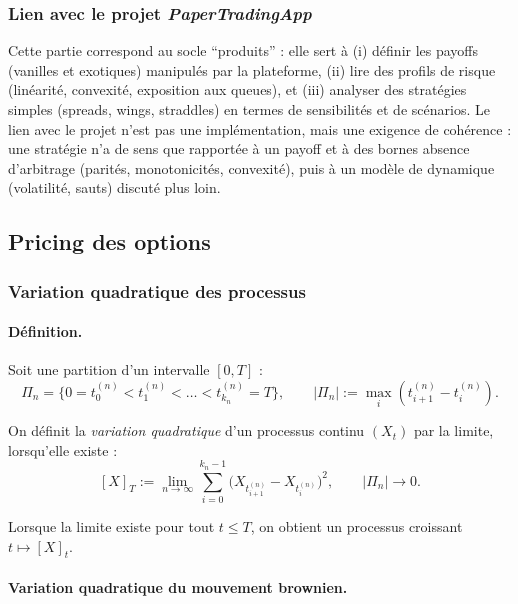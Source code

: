 \documentclass[11pt,a4paper]{article}
\newcommand{\1}{\mathbf{1}}
\begin{document}
\subsubsection{Lien avec le projet \emph{PaperTradingApp}}

Cette partie correspond au socle ``produits'' : elle sert \`a (i) d\'efinir les payoffs (vanilles et exotiques) manipul\'es
par la plateforme, (ii) lire des profils de risque (lin\'earit\'e, convexit\'e, exposition aux queues), et (iii) analyser des
strat\'egies simples (spreads, wings, straddles) en termes de sensibilit\'es et de sc\'enarios. Le lien avec le projet n'est pas
une impl\'ementation, mais une exigence de coh\'erence : une strat\'egie n'a de sens que rapport\'ee \`a un payoff et \`a des bornes
absence d'arbitrage (parit\'es, monotonicit\'es, convexit\'e), puis \`a un mod\`ele de dynamique (volatilité, sauts) discut\'e plus loin.

\subsection{Pricing des options}

\subsubsection{Variation quadratique des processus}

\bigskip

\paragraph{Définition.}

Soit une partition d'un intervalle $[0,T]$ :
\[
\Pi_n = \{0 = t_0^{(n)} < t_1^{(n)} < \dots < t_{k_n}^{(n)} = T\},
\qquad
|\Pi_n| := \max_i (t^{(n)}_{i+1} - t^{(n)}_i).
\]

On définit la \emph{variation quadratique} d'un processus continu $(X_t)$ par la limite,
lorsqu'elle existe :
\[
[X]_T
:= \lim_{n\to\infty}
\sum_{i=0}^{k_n - 1}
\big( X_{t^{(n)}_{i+1}} - X_{t^{(n)}_{i}} \big)^2,
\qquad
|\Pi_n| \to 0.
\]

Lorsque la limite existe pour tout $t\le T$, on obtient un processus croissant
$t\mapsto [X]_t$.

\paragraph{Variation quadratique du mouvement brownien.}
\end{document}
